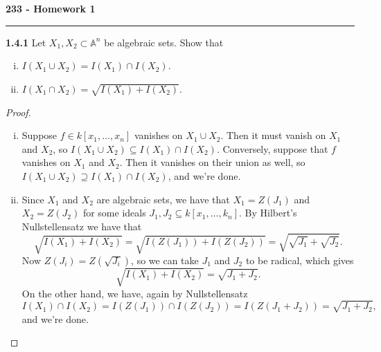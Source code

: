 \documentclass[11pt,letterpaper]{report}
\newcommand{\affine}{\mathbb{A}}
\begin{document}
\begin{center}
{\bf \Large 233 - Homework 1} %
\vspace{0.2cm}
\hrule
\end{center}

\noindent\textbf{1.4.1} Let $X_1, X_2\subset \affine^n$ be algebraic sets. Show that
\begin{enumerate}[(i)]
	\item $I(X_1\cup X_2) = I(X_1)\cap I(X_2)$.
	\item $I(X_1\cap X_2) = \sqrt{I(X_1)+I(X_2)}$.
\end{enumerate}
\begin{proof}
	\begin{enumerate}[(i)]
		\item Suppose $f\in k[x_1, \ldots, x_n]$ vanishes on $X_1\cup X_2$. Then it must vanish on $X_1$ and $X_2$, so $I(X_1\cup X_2)\subseteq I(X_1)\cap I(X_2)$. Conversely, suppose that $f$ vanishes on $X_1$ and $X_2$. Then it vanishes on their union as well, so $I(X_1\cup X_2)\supseteq I(X_1)\cap I(X_2)$, and we're done.

		\item Since $X_1$ and $X_2$ are algebraic sets, we have that $X_1 = Z(J_1)$ and $X_2 = Z(J_2)$ for some ideals $J_1, J_2\subseteq k[x_1, \ldots, k_n]$. By Hilbert's Nullstellensatz we have that
		\[
		\sqrt{I(X_1)+I(X_2)} = \sqrt{I(Z(J_1))+I(Z(J_2))} = \sqrt{\sqrt{J_1} + \sqrt{J_2}}.
		\]
		Now $Z(J_i) = Z(\sqrt{J_i})$, so we can take $J_1$ and $J_2$ to be radical, which gives
		\[
		\sqrt{I(X_1)+I(X_2)} = \sqrt{J_1+J_2}.
		\]
		On the other hand, we have, again by Nullstellensatz
		\[
		I(X_1)\cap I(X_2) = I(Z(J_1))\cap I(Z(J_2)) = I(Z(J_1+J_2)) = \sqrt{J_1+J_2},
		\]
		and we're done.
	\end{enumerate}
\end{proof}
\end{document}

